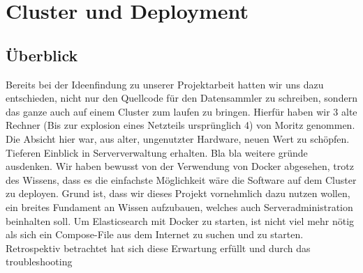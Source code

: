 \documentclass[12pt,twoside,a4paper,parskip]{scrbook}
\begin{document}
\chapter{Cluster und Deployment}
\section{Überblick} Bereits bei der Ideenfindung zu unserer Projektarbeit hatten wir uns dazu entschieden, nicht nur den Quellcode für den Datensammler zu schreiben, sondern das ganze auch auf einem Cluster zum laufen zu bringen. Hierfür haben wir 3 alte Rechner (Bis zur explosion eines Netzteils ursprünglich 4) von Moritz genommen. Die Absicht hier war, aus alter, ungenutzter Hardware, neuen Wert zu schöpfen. Tieferen Einblick in Serververwaltung erhalten. Bla bla weitere gründe ausdenken. Wir haben bewusst von der Verwendung von Docker abgesehen, trotz des Wissens, dass es die einfachste Möglichkeit wäre die Software auf dem Cluster zu deployen. Grund ist, dass wir dieses Projekt vornehmlich dazu nutzen wollen, ein breites Fundament an Wissen aufzubauen, welches auch Serveradministration beinhalten soll. Um Elasticsearch mit Docker zu starten, ist nicht viel mehr nötig als sich ein Compose-File aus dem Internet zu suchen und zu starten. Retrospektiv betrachtet hat sich diese Erwartung erfüllt und durch das troubleshooting
\end{document}

